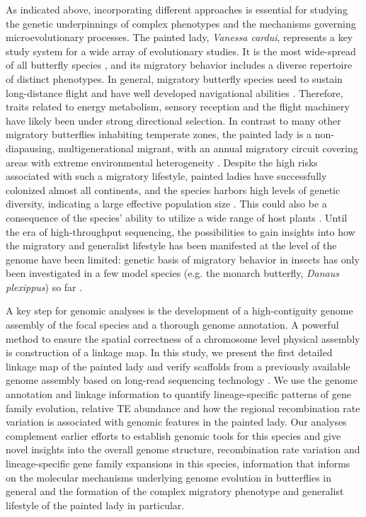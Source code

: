 \documentclass[twocolumn]{bmcart}%
\begin{document}
As indicated above, incorporating different approaches is essential for studying the genetic underpinnings of complex phenotypes and the mechanisms governing microevolutionary processes. The painted lady, \textit{Vanessa cardui}, represents a key study system for a wide array of evolutionary studies. It is the most wide-spread of all butterfly species \citep{talaveraRoundtripSaharaAfrotropical2018}, and its migratory behavior includes a diverse repertoire of distinct phenotypes. In general, migratory butterfly species need to sustain long-distance flight and have well developed navigational abilities \citep{chapmanLongrangeSeasonalMigration2015,guerra_magnetic_2014}. Therefore, traits related to energy metabolism, sensory reception and the flight machinery have likely been under strong directional selection. In contrast to many other migratory butterflies inhabiting temperate zones, the painted lady is a non-diapausing, multigenerational migrant, with an annual migratory circuit covering areas with extreme environmental heterogeneity \citep{talaveraDiscoveryMassMigration2016,menchetti_spatio-temporal_2019}. Despite the high risks associated with such a migratory lifestyle, painted ladies have successfully colonized almost all continents, and the species harbors high levels of genetic diversity, indicating a large effective population size \citep{garcia-berroGenomicDemographicInferenceinprep}. This could also be a consequence of the species’ ability to utilize a wide range of host plants \citep{celorio-manceraEvolutionaryHistoryHost2016, ackery_hostplants_1988}. Until the era of high-throughput sequencing, the possibilities to gain insights into how the migratory and generalist lifestyle has been manifested at the level of the genome have been limited: genetic basis of migratory behavior in insects has only been investigated in a few model species (e.g. the monarch butterfly, \textit{Danaus plexippus}) so far \citep{merlinGeneticsEpigeneticsAnimal2019}.

A key step for genomic analyses is the development of a high-contiguity genome assembly of the focal species and a thorough genome annotation. A powerful method to ensure the spatial correctness of a chromosome level physical assembly is construction of a linkage map. In this study, we present the first detailed linkage map of the painted lady and verify scaffolds from a previously available genome assembly based on long-read sequencing technology \citep{lohse_genome_2021}. 
We use the genome annotation and linkage information to quantify lineage-specific patterns of gene family evolution, relative TE abundance and how the regional recombination rate variation is associated with genomic features in the painted lady. Our analyses complement earlier efforts to establish genomic tools for this species
\citep{connahsTranscriptomeAnalysisPainted2016a, zhangHighQualityGenomeAssembly2021} and give novel insights into the overall genome structure, recombination rate variation and lineage-specific gene family expansions in this species, information that informs on the molecular mechanisms underlying genome evolution in butterflies in general and the formation of the complex migratory phenotype and generalist lifestyle of the painted lady in particular.
\end{document}
